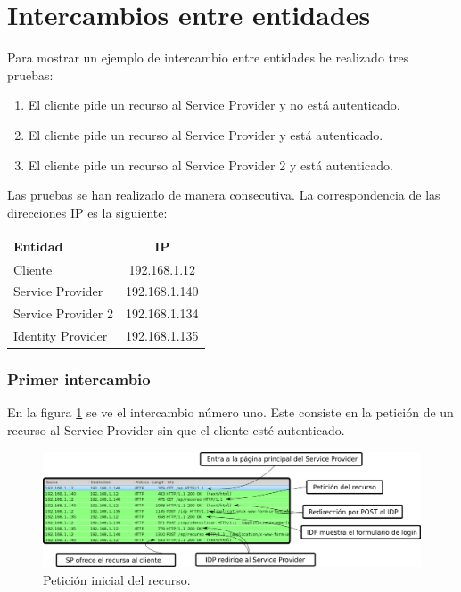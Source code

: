 \section{Intercambios entre entidades} \label{sec:intercambio}
Para mostrar un ejemplo de intercambio entre entidades he realizado tres pruebas:
\begin{enumerate}
 \item El cliente pide un recurso al Service Provider y no está autenticado.
 \item El cliente pide un recurso al Service Provider y está autenticado.
 \item El cliente pide un recurso al Service Provider 2 y está autenticado.
\end{enumerate}

Las pruebas se han realizado de manera consecutiva. La correspondencia de las direcciones IP es la siguiente:
\begin{center}
\begin{tabular}{| l | c |}
	\hline
	\textbf{Entidad} & \textbf{IP} \\ \hline \hline 
	Cliente & 192.168.1.12 \\ \hline
	Service Provider & 192.168.1.140 \\ \hline
	Service Provider 2 & 192.168.1.134 \\ \hline
	Identity Provider & 192.168.1.135 \\ \hline
\end{tabular}
\end{center}

\subsubsection*{Primer intercambio}
En la figura \ref{fig:int1} se ve el intercambio número uno. Este consiste en la petición de un recurso al Service Provider sin que el cliente esté autenticado.

\begin{figure}[h!]
\centering
\includegraphics[width=\textwidth]{img/intercambio1-comentado}
\caption{Petición inicial del recurso.}
\label{fig:int1}
\end{figure}

